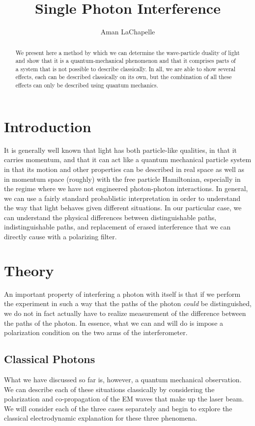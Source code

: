 \documentclass{article}
\title{Single Photon Interference}
\author{Aman LaChapelle}
\begin{document}
\raggedright
\maketitle

\begin{abstract}
	We present here a method by which we can determine the wave-particle duality of light and show that it is a quantum-mechanical phenomenon and that it comprises parts of a system that is not possible to describe classically.  In all, we are able to show several effects, each can be described classically on its own, but the combination of all these effects can only be described using quantum mechanics.
\end{abstract}

\tableofcontents
\newpage

\section{Introduction}
	It is generally well known that light has both particle-like qualities, in that it carries momentum, and that it can act like a quantum mechanical particle system in that its motion and other properties can be described in real space as well as in momentum space (roughly) with the free particle Hamiltonian, especially in the regime where we have not engineered photon-photon interactions.  In general, we can use a fairly standard probablistic interpretation in order to understand the way that light behaves given different situations.  In our particular case, we can understand the physical differences between distinguishable paths, indistinguishable paths, and replacement of erased interference that we can directly cause with a polarizing filter.


\section{Theory}
	An important property of interfering a photon with itself is that if we perform the experiment in such a way that the paths of the photon \emph{could} be distinguished, we do not in fact actually have to realize measurement of the difference between the paths of the photon.  In essence, what we can and will do is impose a polarization condition on the two arms of the interferometer.

	\subsection{Classical Photons}
	What we have discussed so far is, however, a quantum mechanical observation.  We can describe each of these situations classically by considering the polarization and co-propagation of the EM waves that make up the laser beam.  We will consider each of the three cases separately and begin to explore the classical electrodynamic explanation for these three phenomena.
\end{document}
